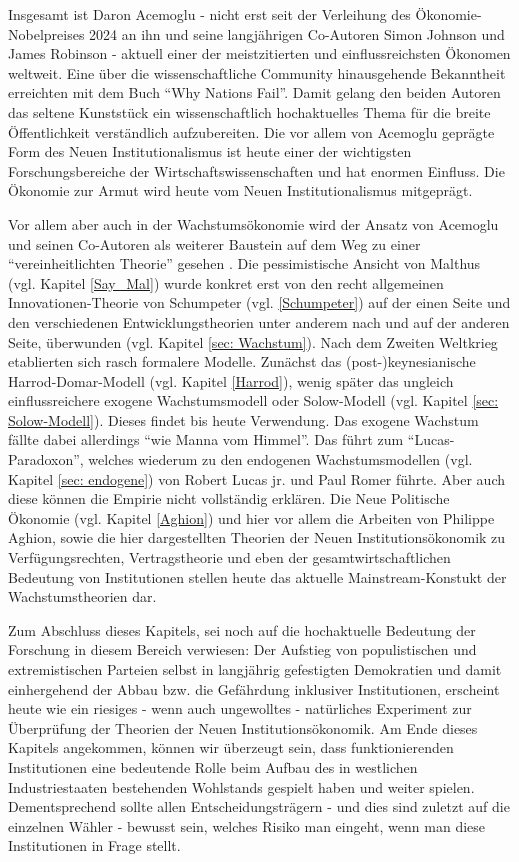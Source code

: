 Insgesamt ist Daron Acemoglu - nicht erst seit der Verleihung des Ökonomie-Nobelpreises 2024 an ihn und seine langjährigen Co-Autoren Simon Johnson und James Robinson - aktuell einer der meistzitierten und einflussreichsten Ökonomen weltweit. Eine über die wissenschaftliche Community hinausgehende Bekanntheit erreichten \textcite{Acemoglu2012} mit dem Buch "`Why Nations Fail"'. Damit gelang den beiden Autoren das seltene Kunststück ein wissenschaftlich hochaktuelles Thema für die breite Öffentlichkeit verständlich aufzubereiten. Die vor allem von Acemoglu geprägte Form des Neuen Institutionalismus ist heute einer der wichtigsten Forschungsbereiche der Wirtschaftswissenschaften und hat enormen Einfluss. Die Ökonomie zur Armut wird heute vom Neuen Institutionalismus mitgeprägt.

Vor allem aber auch in der Wachstumsökonomie wird der Ansatz von Acemoglu und seinen Co-Autoren als weiterer Baustein auf dem Weg zu einer "`vereinheitlichten Theorie"' gesehen \parencite[S. 654]{Snowdon2005}. Die pessimistische Ansicht von Malthus (vgl. Kapitel \ref{Say_Mal}) wurde konkret erst von den recht allgemeinen Innovationen-Theorie von Schumpeter (vgl. \ref{Schumpeter}) auf der einen Seite und den verschiedenen Entwicklungstheorien unter anderem nach \textcite{Rostow1960} und \textcite{Gerschenkron1962} auf der anderen Seite, überwunden (vgl. Kapitel \ref{sec: Wachstum}). Nach dem Zweiten Weltkrieg etablierten sich rasch formalere Modelle. Zunächst das (post-)keynesianische Harrod-Domar-Modell (vgl. Kapitel \ref{Harrod}), wenig später das ungleich einflussreichere exogene Wachstumsmodell oder Solow-Modell (vgl. Kapitel \ref{sec: Solow-Modell}). Dieses findet bis heute Verwendung. Das exogene Wachstum fällte dabei allerdings "`wie Manna vom Himmel"'. Das führt zum "`Lucas-Paradoxon"', welches wiederum zu den endogenen Wachstumsmodellen (vgl. Kapitel \ref{sec: endogene}) von Robert Lucas jr. und Paul Romer führte. Aber auch diese können die Empirie nicht vollständig erklären. Die Neue Politische Ökonomie (vgl. Kapitel \ref{Aghion}) und hier vor allem die Arbeiten von Philippe Aghion, sowie die hier dargestellten Theorien der Neuen Institutionsökonomik zu Verfügungsrechten, Vertragstheorie und eben der gesamtwirtschaftlichen Bedeutung von Institutionen stellen heute das aktuelle Mainstream-Konstukt der Wachstumstheorien dar.

Zum Abschluss dieses Kapitels, sei noch auf die hochaktuelle Bedeutung der Forschung in diesem Bereich verwiesen: Der Aufstieg von populistischen und extremistischen Parteien selbst in langjährig gefestigten Demokratien und damit einhergehend der Abbau bzw. die Gefährdung inklusiver Institutionen, erscheint heute wie ein riesiges - wenn auch ungewolltes - natürliches Experiment zur Überprüfung der Theorien der Neuen Institutionsökonomik. Am Ende dieses Kapitels angekommen, können wir überzeugt sein, dass funktionierenden Institutionen eine bedeutende Rolle beim Aufbau des in westlichen Industriestaaten bestehenden Wohlstands gespielt haben und weiter spielen. Dementsprechend sollte allen Entscheidungsträgern - und dies sind zuletzt auf die einzelnen Wähler - bewusst sein, welches Risiko man eingeht, wenn man diese Institutionen in Frage stellt.